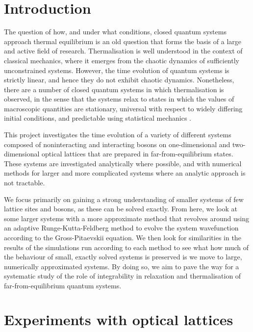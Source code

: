 \documentclass[a4paper, 10pt]{article}
\theoremstyle{plain}
\begin{document}
\section*{Introduction}
The question of how, and under what conditions, closed quantum systems approach
thermal equilibrium is an old question that forms the basis of a large and
active field of research. Thermalisation is well understood in the context
of classical mechanics, where it emerges from the chaotic
dynamics of sufficiently unconstrained systems. However, the time evolution of
quantum systems is strictly linear, and hence they do not exhibit chaotic
dynamics. Nonetheless, there are a number of closed quantum systems in which
thermalisation is observed, in the sense that the systems relax to states in
which the values of macroscopic quantities are stationary, universal with
respect to widely differing initial conditions, and predictable using
statistical mechanics \cite{Rigol2008}.

This project investigates the time evolution of a variety of different systems
composed of noninteracting and interacting bosons on one-dimensional and
two-dimensional optical lattices that are prepared in far-from-equilibrium
states. These systems are investigated analytically where possible, and with
numerical methods for larger and more complicated systems where an analytic
approach is not tractable. 

We focus primarily on gaining a strong
understanding of smaller systems of few lattice sites and bosons, as these
can be solved exactly. From here, we look at some larger systems with a more
approximate method that revolves around using an adaptive Runge-Kutta-Feldberg
method to evolve the system wavefunction according to the Gross-Pitaevskii
equation. We then look for similarities in the results of the simulations run
according to each method to see what how much of the behaviour of small,
exactly solved systems is preserved is we move to large, numerically approximated
systems. By doing so, we aim to pave the way for a systematic study of the role
of integrability in relaxation and thermalisation of far-from-equilibrium
quantum systems.
\newpage


\section{Experiments with optical lattices}
\end{document}
